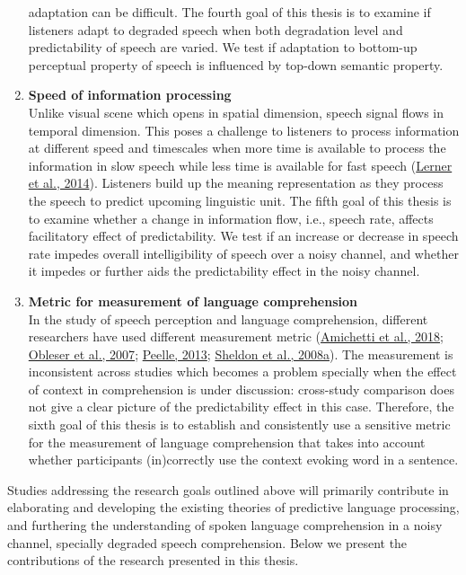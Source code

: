 \documentclass[a4paper, nobind]{templates/ociamthesis}
\begin{document}
\begin{enumerate}
  adaptation can be difficult.
  The fourth goal of this thesis is to examine if listeners adapt to degraded speech when both degradation level and predictability of speech are varied.
  We test if adaptation to bottom-up perceptual property of speech is influenced by top-down semantic property.
\item
  \textbf{Speed of information processing}\\
  Unlike visual scene which opens in spatial dimension, speech signal flows in temporal dimension.
  This poses a challenge to listeners to process information at different speed and timescales when
  more time is available to process the information in slow speech while less time is available for fast speech (\protect\hyperlink{ref-Lerner2014}{Lerner et al., 2014}).
  Listeners build up the meaning representation as they process the speech to predict upcoming linguistic unit.
  The fifth goal of this thesis is to examine whether a change in information flow, i.e., speech rate, affects facilitatory effect of predictability.
  We test if an increase or decrease in speech rate impedes overall intelligibility of speech over a noisy channel,
  and whether it impedes or further aids the predictability effect in the noisy channel.
\item
  \textbf{Metric for measurement of language comprehension}\\
  In the study of speech perception and language comprehension, different researchers have used different measurement metric (\protect\hyperlink{ref-Amichetti2018}{Amichetti et al., 2018}; \protect\hyperlink{ref-Obleser2007}{Obleser et al., 2007}; \protect\hyperlink{ref-Peelle2013}{Peelle, 2013}; \protect\hyperlink{ref-Sheldon2008a}{Sheldon et al., 2008a}).
  The measurement is inconsistent across studies which becomes a problem specially when the effect of context in comprehension is under discussion:
  cross-study comparison does not give a clear picture of the predictability effect in this case.
  Therefore, the sixth goal of this thesis is to establish and consistently use a sensitive metric for the measurement of language comprehension that takes into account whether participants (in)correctly use the context evoking word in a sentence.
\end{enumerate}

Studies addressing the research goals outlined above will primarily contribute in elaborating and developing the existing theories of predictive language processing, and furthering the understanding of spoken language comprehension in a noisy channel, specially degraded speech comprehension.
Below we present the contributions of the research presented in this thesis.
\end{document}
